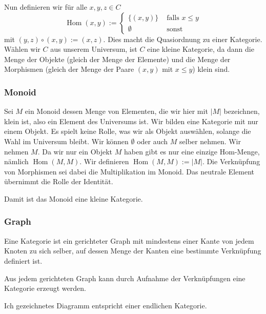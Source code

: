\documentclass[a4paper]{amsart}
\theoremstyle{definition}
\DeclareMathOperator{\Hom}{Hom}
\begin{document}
Nun definieren wir für alle $x, y, z \in C$
\begin{equation}
   \Hom(x,y) := \begin{cases}
      \{ (x,y) \} & \text{ falls } x \le y\\
      \emptyset & \text{ sonst }
   \end{cases}
\end{equation}
mit $(y,z) \circ (x,y) := (x,z)$. Dies macht die Quasiordnung zu einer Kategorie. Wählen wir $C$ aus unserem Universum, ist $C$ eine kleine Kategorie, da dann die Menge der Objekte (gleich der Menge der Elemente) und die Menge der Morphismen (gleich der Menge der Paare $(x,y)$ mit $x \le y$) klein sind.

\subsubsection{Monoid}
Sei $M$ ein Monoid dessen Menge von Elementen, die wir hier mit $|M|$ bezeichnen, klein ist, also ein Element des Universums ist. Wir bilden eine Kategorie mit nur einem Objekt. Es spielt keine Rolle, was wir als Objekt auswählen, solange die Wahl im Universum bleibt. Wir können $\emptyset$ oder auch $M$ selber nehmen. Wir nehmen $M$. Da wir nur ein Objekt $M$ haben gibt es nur eine einzige Hom-Menge, nämlich $\Hom( M, M )$. Wir definieren $\Hom( M, M ) := |M|$. Die Verknüpfung von Morphismen sei dabei die Multiplikation im Monoid. Das neutrale Element übernimmt die Rolle der Identität.

Damit ist das Monoid eine kleine Kategorie.

\subsubsection{Graph}
Eine Kategorie ist ein gerichteter Graph mit mindestens einer Kante von jedem Knoten zu sich selber, auf dessen Menge der Kanten eine bestimmte Verknüpfung definiert ist.

Aus jedem gerichteten Graph kann durch Aufnahme der Verknüpfungen eine Kategorie erzeugt werden.

Ich gezeichnetes Diagramm entspricht einer endlichen Kategorie.

\end{document}
